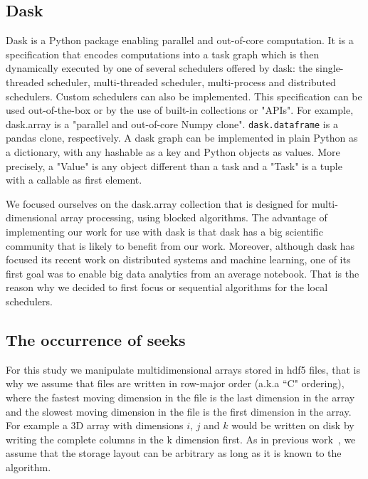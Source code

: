 \documentclass[conference]{IEEEtran}
\begin{document}
\subsection{Dask}

Dask is a Python package enabling parallel and out-of-core computation. It is
a specification that encodes computations into a task graph which is then
dynamically executed by one of several schedulers offered by dask: the
single-threaded scheduler, multi-threaded scheduler, multi-process and
distributed schedulers. Custom schedulers can also be implemented. This
specification can be used out-of-the-box or by the use of built-in collections
or "APIs". For example, dask.array is a "parallel and out-of-core Numpy clone".
\texttt{dask.dataframe} is a pandas clone, respectively. A dask graph can be
implemented in plain Python as a dictionary, with any hashable as a key and
Python objects as values. More precisely, a "Value" is any object different than
a task and a "Task" is a tuple with a callable as first element.

We focused ourselves on the dask.array collection that is designed for
multi-dimensional array processing, using blocked algorithms. The advantage of
implementing our work for use with dask is that dask has a big scientific
community that is likely to benefit from our work. Moreover, although dask has
focused its recent work on distributed systems and machine learning, one of its
first goal was to enable big data analytics from an average notebook. That is
the reason why we decided to first focus or sequential algorithms for the
local schedulers. 

\subsection{The occurrence of seeks}
For this study we manipulate multidimensional arrays stored in hdf5 files,
that is why we assume that files are written in row-major order (a.k.a ``C" ordering),
where the fastest moving dimension in the file is the last dimension in the
array and the slowest moving dimension in the file is the first dimension
in the array. For example a 3D array with dimensions $i$, $j$ and $k$ would be
written on disk by writing the complete columns in the k dimension first.
As in previous work~\cite{seqalgorithms}, we assume that the storage layout can
be arbitrary as long as it is known to the algorithm.
\end{document}
